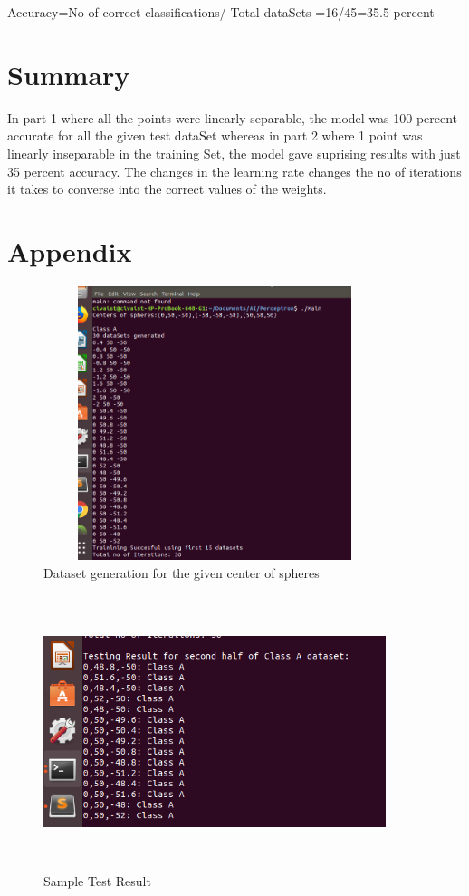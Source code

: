 \documentclass[letterpaper]{article}
\begin{document}
Accuracy=No of correct classifications/ Total dataSets =16/45=35.5 percent 

  \section {Summary}
  In part 1 where all the points were linearly separable, the model was 100 percent accurate for all the given test dataSet whereas in part 2 where 1 point was linearly inseparable in the training Set, the model gave suprising results with just 35 percent accuracy. The changes in the learning rate changes the no of iterations it takes to converse into the correct values of the weights. 
  \section {Appendix}

\begin{figure}[h]
\caption{Dataset generation for the given center of spheres}
\centering
\includegraphics[width=10cm,height=8cm]{Dataset_generation}
\end{figure}

\begin{figure}[h]
\caption{Sample Test Result}
\centering
\includegraphics[width=10cm,height=8cm]{test_result}
\end{figure}
 
\end{document}
